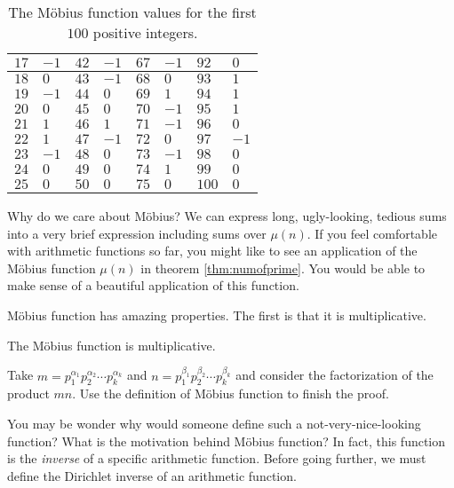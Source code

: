 \documentclass[12pt]{subfile}
\begin{document}
\begin{example}
\begin{table}
\begin{tabular}{ | l | l | l | l | l | l | l | l | }
					$17$ & $-1$  & $42$ & $-1$ & $67$ & $-1$ & $92$  & $0$     \\ \hline
					$18$ & $0$   & $43$ & $-1$ & $68$ & $0$  & $93$  & $1$     \\ \hline
					$19$ & $-1$  & $44$ & $0$  & $69$ & $1$  & $94$  & $1$     \\ \hline
					$20$ & $0$   & $45$ & $0$  & $70$ & $-1$ & $95$  & $1$     \\ \hline
					$21$ & $1$   & $46$ & $1$  & $71$ & $-1$ & $96$  & $0$     \\ \hline
					$22$ & $1$   & $47$ & $-1$ & $72$ & $0$  & $97$  & $-1$    \\ \hline
					$23$ & $-1$  & $48$ & $0$  & $73$ & $-1$ & $98$  & $0$     \\ \hline
					$24$ & $0$   & $49$ & $0$  & $74$ & $1$  & $99$  & $0$     \\ \hline
					$25$ & $0$   & $50$ & $0$  & $75$ & $0$  & $100$ & $0$      \\ \hline
				\end{tabular}
				\caption{The M\"{o}bius function values for the first $100$ positive integers.}
				\label{table:mu(n)}
			\end{table}
		\end{example}

	\begin{note}
		Why do we care about M\"{o}bius? We can express long, ugly-looking, tedious sums into a very brief expression including sums over $\mu(n)$. If you feel comfortable with arithmetic functions so far, you might like to see an application of the M\"{o}bius function $\mu(n)$ in theorem \ref{thm:numofprime}. You would be able to make sense of a beautiful application of this function.
	\end{note}
		M\"{o}bius function has amazing properties. The first is that it is multiplicative.
		\begin{proposition}
			The M\"{o}bius function is multiplicative.
		\end{proposition}

		\begin{hint}
			Take $m=p_1^{\alpha_1}p_2^{\alpha_2} \cdots p_k^{\alpha_k}$ and $n=p_1^{\beta_1}p_2^{\beta_2} \cdots p_k^{\beta_k}$ and consider the factorization of the product $mn$. Use the definition of M\"{o}bius function to finish the proof.
		\end{hint}

	You may be wonder why would someone define such a not-very-nice-looking function? What is the motivation behind M\"{o}bius function? In fact, this function is the \textit{inverse} of a specific arithmetic function. Before going further, we must define the Dirichlet inverse of an arithmetic function.
\end{document}
